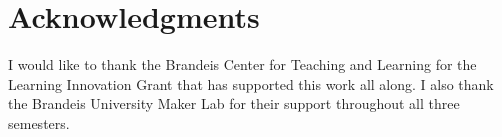 \section{Acknowledgments} I would like to thank the Brandeis Center for Teaching and Learning for the Learning Innovation Grant that has supported this work all along. I also thank the Brandeis University Maker Lab for their support throughout all three semesters. 